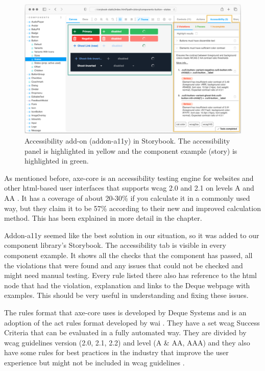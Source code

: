 \documentclass{master_thesis}
\begin{document}
\begin{figure}[h]
	\includegraphics[width=\textwidth]{img/addon-a11y.png}
	\caption{Accessibility add-on (addon-a11y) in Storybook. The accessibility panel is highlighted in yellow and the component example (story) is highlighted in green.}
	\label{fig:addon-a11y}
\end{figure}

As mentioned before, axe-core is an accessibility testing engine for websites and other \ac{html}-based user interfaces that supports \ac{wcag} 2.0 and 2.1 on levels A and AA \citep{Deque2023}. It has a coverage of about 20-30\% if you calculate it in a commonly used way, but they claim it to be 57\% according to their new and improved calculation method. This has been explained in more detail in the  chapter.

Addon-a11y seemed like the best solution in our situation, so it was added to our component library’s Storybook. The accessibility tab is visible in every component example. It shows all the checks that the component has passed, all the violations that were found and any issues that could not be checked and might need manual testing. Every rule listed there also has reference to the \ac{html} node that had the violation, explanation and links to the Deque webpage with examples. This should be very useful in understanding and fixing these issues.

The rules format that axe-core uses is developed by Deque Systems and is an adoption of the \ac{act} rules format developed by \ac{wai} \citep{Fiers2017}. They have a set \ac{wcag} Success Criteria that can be evaluated in a fully automated way. They are divided by \ac{wcag} guidelines version (2.0, 2.1, 2.2) and level (A \& AA, AAA) and they also have some rules for best practices in the industry that improve the user experience but might not be included in \ac{wcag} guidelines \citep{Fiers2023}.
\end{document}
